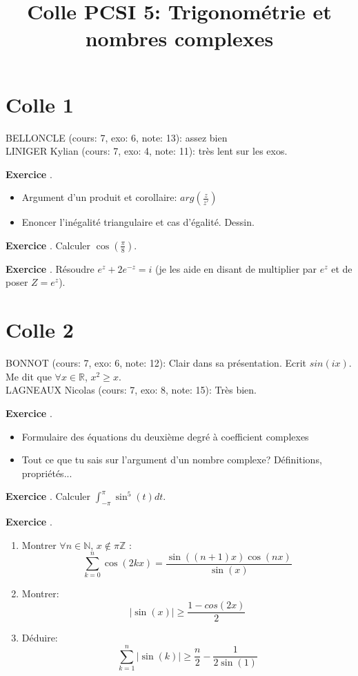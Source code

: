 \documentclass[10pt,a4paper]{article}
\title{Colle PCSI 5: Trigonométrie et nombres complexes}
\newcounter{question}
\newcounter{exo}
\newenvironment{exo}{\vspace{0.5cm}\setcounter{question}{0}\addtocounter{exo}{1} \noindent \textbf{Exercice \theexo}. \normalsize }{\par}
\begin{document}
	\maketitle

	\section*{Colle 1}
	BELLONCLE (cours: 7, exo: 6, note: 13): assez bien\\
	LINIGER Kylian (cours: 7, exo: 4, note: 11): très lent sur les exos. 
	
	\begin{exo} 
		\begin{itemize}
				\item Argument d'un produit et corollaire: $arg(\frac{z}{z'})$
			\item Enoncer l'inégalité triangulaire et cas d'égalité. Dessin. 
		\end{itemize}
	\end{exo}
	
	\begin{exo}
		Calculer $\cos(\frac{\pi}{8})$.
	\end{exo}

	\begin{exo}
		Résoudre $e^z + 2 e^{-z} = i$ (je les aide en disant de multiplier par $e^z$ et de poser $Z = e^z$).
	\end{exo}
	
	\section*{Colle 2}
	\setcounter{exo}{0}
	BONNOT (cours: 7, exo: 6, note: 12): Clair dans sa présentation. Ecrit $sin(ix)$. Me dit que $\forall x \in \mathbb{R}$, $x^2 \geq x$. \\
	LAGNEAUX Nicolas (cours: 7, exo: 8, note: 15): Très bien. 
	
	\begin{exo}
		\begin{itemize}
			\item Formulaire des équations du deuxième degré à coefficient complexes
			\item Tout ce que tu sais sur l'argument d'un nombre complexe? Définitions, propriétés...
		\end{itemize}
	\end{exo}
	
	\begin{exo}
		Calculer $\int_{-\pi}^{\pi} \sin^5(t)dt$.
	\end{exo}
	\begin{exo}
		\begin{enumerate}
			\item Montrer $\forall n \in \mathbb{N}$, $x \notin \pi \mathbb{Z}$ :
			$$\sum_{k=0}^{n} \cos(2kx) = \frac{\sin((n+1)x) \cos(nx)}{\sin(x)}$$
			\item Montrer:
			$$\vert \sin(x) \vert \geq \frac{1 - cos(2x)}{2}$$
			\item Déduire:
			$$\sum_{k=1}^{n} \vert \sin(k) \vert \geq \frac{n}{2}  - \frac{1}{2 \sin(1)}$$
		\end{enumerate}
	\end{exo}
	
\end{document}

